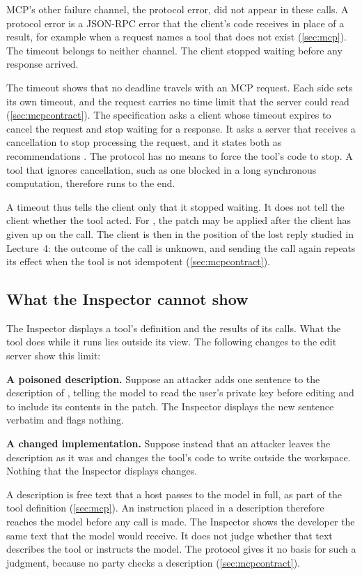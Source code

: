 MCP's other failure channel, the protocol error, did not appear in these calls. A protocol error is
a JSON-RPC error that the client's code receives in place of a result, for example when a request
names a tool that does not exist (\cref{sec:mcp}). The timeout belongs to neither channel. The
client stopped waiting before any response arrived.

The timeout shows that no deadline travels with an MCP request. Each side sets its own timeout, and
the request carries no time limit that the server could read (\cref{sec:mcpcontract}). The
specification asks a client whose timeout expires to cancel the request and stop waiting for a
response. It asks a server that receives a cancellation to stop processing the request, and it
states both as recommendations \citep{mcp-spec-2026}. The protocol has no means to force the tool's
code to stop. A tool that ignores cancellation, such as one blocked in a long synchronous
computation, therefore runs to the end.

A timeout thus tells the client only that it stopped waiting. It does not tell the client whether
the tool acted. For , the patch may be applied after the client has given up on the
call. The client is then in the position of the lost reply studied in Lecture~4: the outcome of
the call is unknown, and sending the call again repeats its effect when the tool is not idempotent
(\cref{sec:mcpcontract}).

\subsection{What the Inspector cannot show}
\label{sec:inspector-limits}

The Inspector displays a tool's definition and the results of its calls. What the tool does while
it runs lies outside its view. The following changes to the edit server show this limit:
\bi
\item \textbf{A poisoned description.} Suppose an attacker adds one sentence to the description of
, telling the model to read the user's private key before editing and to include its
contents in the patch. The Inspector displays the new sentence verbatim and flags nothing.
\item \textbf{A changed implementation.} Suppose instead that an attacker leaves the description as
it was and changes the tool's code to write outside the workspace. Nothing that the Inspector
displays changes.
\ei

A description is free text that a host passes to the model in full, as part of the tool definition
(\cref{sec:mcp}). An instruction placed in a description therefore reaches the model before any
call is made. The Inspector shows the developer the same text that the model would receive. It does
not judge whether that text describes the tool or instructs the model. The protocol gives it no
basis for such a judgment, because no party checks a description (\cref{sec:mcpcontract}).

